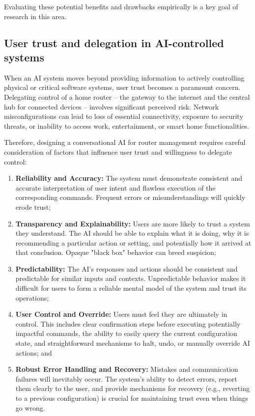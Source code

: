 Evaluating these potential benefits and drawbacks empirically is a key goal of research in this area.

\subsection{User trust and delegation in AI-controlled systems}
When an AI system moves beyond providing information to actively controlling physical or critical software systems, user trust becomes a paramount concern. Delegating control of a home router – the gateway to the internet and the central hub for connected devices – involves significant perceived risk. Network misconfigurations can lead to loss of essential connectivity, exposure to security threats, or inability to access work, entertainment, or smart home functionalities.

Therefore, designing a conversational AI for router management requires careful consideration of factors that influence user trust and willingness to delegate control:

\begin{enumerate}
\item \textbf{Reliability and Accuracy:} The system must demonstrate consistent and accurate interpretation of user intent and flawless execution of the corresponding commands. Frequent errors or misunderstandings will quickly erode trust;

\item \textbf{Transparency and Explainability:} Users are more likely to trust a system they understand. The AI should be able to explain what it is doing, why it is recommending a particular action or setting, and potentially how it arrived at that conclusion. Opaque "black box" behavior can breed suspicion;

\item \textbf{Predictability:} The AI's responses and actions should be consistent and predictable for similar inputs and contexts. Unpredictable behavior makes it difficult for users to form a reliable mental model of the system and trust its operations;

\item \textbf{User Control and Override:} Users must feel they are ultimately in control. This includes clear confirmation steps before executing potentially impactful commands, the ability to easily query the current configuration state, and straightforward mechanisms to halt, undo, or manually override AI actions; and

\item \textbf{Robust Error Handling and Recovery:} Mistakes and communication failures will inevitably occur. The system's ability to detect errors, report them clearly to the user, and provide mechanisms for recovery (e.g., reverting to a previous configuration) is crucial for maintaining trust even when things go wrong.
\end{enumerate}

